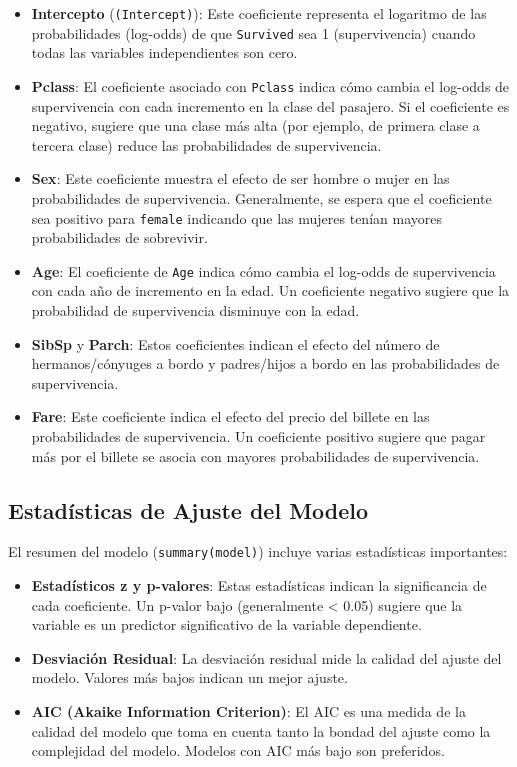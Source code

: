\begin{itemize}
    \item \textbf{Intercepto} (\texttt{(Intercept)}): Este coeficiente representa el logaritmo de las probabilidades (log-odds) de que \texttt{Survived} sea 1 (supervivencia) cuando todas las variables independientes son cero.
    \item \textbf{Pclass}: El coeficiente asociado con \texttt{Pclass} indica cómo cambia el log-odds de supervivencia con cada incremento en la clase del pasajero. Si el coeficiente es negativo, sugiere que una clase más alta (por ejemplo, de primera clase a tercera clase) reduce las probabilidades de supervivencia.
    \item \textbf{Sex}: Este coeficiente muestra el efecto de ser hombre o mujer en las probabilidades de supervivencia. Generalmente, se espera que el coeficiente sea positivo para \texttt{female} indicando que las mujeres tenían mayores probabilidades de sobrevivir.
    \item \textbf{Age}: El coeficiente de \texttt{Age} indica cómo cambia el log-odds de supervivencia con cada año de incremento en la edad. Un coeficiente negativo sugiere que la probabilidad de supervivencia disminuye con la edad.
    \item \textbf{SibSp} y \textbf{Parch}: Estos coeficientes indican el efecto del número de hermanos/cónyuges a bordo y padres/hijos a bordo en las probabilidades de supervivencia.
    \item \textbf{Fare}: Este coeficiente indica el efecto del precio del billete en las probabilidades de supervivencia. Un coeficiente positivo sugiere que pagar más por el billete se asocia con mayores probabilidades de supervivencia.
\end{itemize}

\subsection*{Estadísticas de Ajuste del Modelo}

El resumen del modelo (\texttt{summary(model)}) incluye varias estadísticas importantes:

\begin{itemize}
    \item \textbf{Estadísticos z y p-valores}: Estas estadísticas indican la significancia de cada coeficiente. Un p-valor bajo (generalmente < 0.05) sugiere que la variable es un predictor significativo de la variable dependiente.
    \item \textbf{Desviación Residual}: La desviación residual mide la calidad del ajuste del modelo. Valores más bajos indican un mejor ajuste.
    \item \textbf{AIC (Akaike Information Criterion)}: El AIC es una medida de la calidad del modelo que toma en cuenta tanto la bondad del ajuste como la complejidad del modelo. Modelos con AIC más bajo son preferidos.
\end{itemize}

